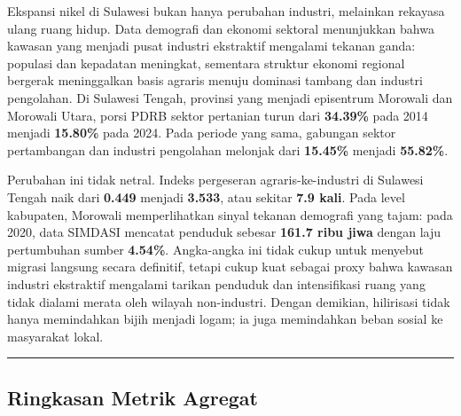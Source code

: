 \documentclass[
]{article}
\begin{document}
Ekspansi nikel di Sulawesi bukan hanya perubahan industri, melainkan
rekayasa ulang ruang hidup. Data demografi dan ekonomi sektoral
menunjukkan bahwa kawasan yang menjadi pusat industri ekstraktif
mengalami tekanan ganda: populasi dan kepadatan meningkat, sementara
struktur ekonomi regional bergerak meninggalkan basis agraris menuju
dominasi tambang dan industri pengolahan. Di Sulawesi Tengah, provinsi
yang menjadi episentrum Morowali dan Morowali Utara, porsi PDRB sektor
pertanian turun dari \textbf{34.39\%} pada 2014 menjadi \textbf{15.80\%}
pada 2024. Pada periode yang sama, gabungan sektor pertambangan dan
industri pengolahan melonjak dari \textbf{15.45\%} menjadi
\textbf{55.82\%}.

Perubahan ini tidak netral. Indeks pergeseran agraris-ke-industri di
Sulawesi Tengah naik dari \textbf{0.449} menjadi \textbf{3.533}, atau
sekitar \textbf{7.9 kali}. Pada level kabupaten, Morowali memperlihatkan
sinyal tekanan demografi yang tajam: pada 2020, data SIMDASI mencatat
penduduk sebesar \textbf{161.7 ribu jiwa} dengan laju pertumbuhan sumber
\textbf{4.54\%}. Angka-angka ini tidak cukup untuk menyebut migrasi
langsung secara definitif, tetapi cukup kuat sebagai proxy bahwa kawasan
industri ekstraktif mengalami tarikan penduduk dan intensifikasi ruang
yang tidak dialami merata oleh wilayah non-industri. Dengan demikian,
hilirisasi tidak hanya memindahkan bijih menjadi logam; ia juga
memindahkan beban sosial ke masyarakat lokal.

\begin{center}\rule{0.5\linewidth}{0.5pt}\end{center}

\subsection{Ringkasan Metrik Agregat}\label{ringkasan-metrik-agregat}
\end{document}
